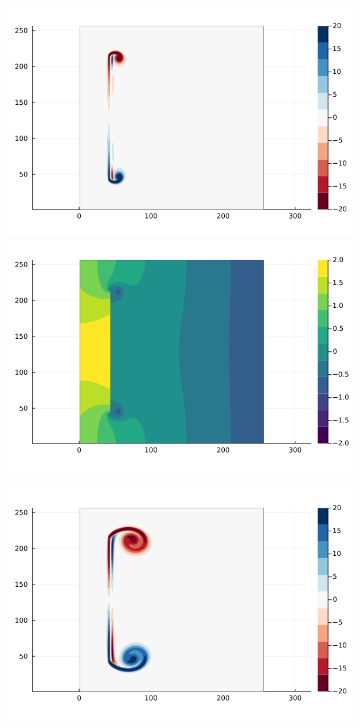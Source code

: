 \documentclass{article}
\begin{document}
\begin{figure}
    \centering
    \begin{subfigure}{.33\textwidth}
        \centering
        \includegraphics[trim={4cm 7.2cm 5cm 1cm},clip,width=\textwidth]{tex/fig/Disk_reflect_omega_1.png}
        \includegraphics[trim={4cm 1.5cm 5cm 7cm},clip,width=\textwidth]{tex/fig/Disk_reflect_press_1.png}
    \end{subfigure}%
    \begin{subfigure}{.33\textwidth}
        \centering
        \includegraphics[trim={4cm 7.2cm 5cm 1cm},clip,width=\textwidth]{tex/fig/Disk_reflect_omega_2.png}

\end{subfigure}
\end{figure}
\end{document}
